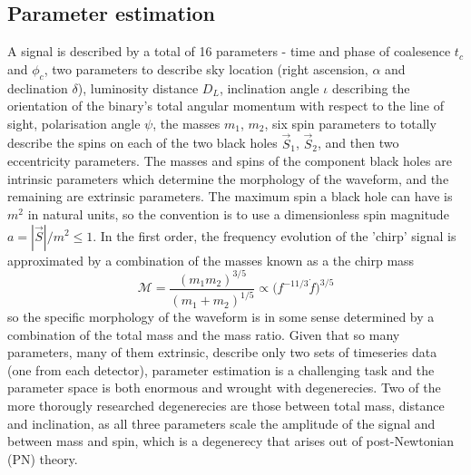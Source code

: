 \documentclass[]{article}
\begin{document}
\subsection{Parameter estimation}
A signal is described by a total of 16 parameters\cite{props} - time and phase of coalesence $t_c$ and $\phi_c$, two parameters to describe sky location (right ascension, $\alpha$ and declination $\delta$), luminosity distance $D_L$, inclination angle $\iota$ describing the orientation of the binary's total angular momentum with respect to the line of sight, polarisation angle $\psi$, the masses $m_1$, $m_2$, six spin parameters to totally describe the spins on each of the two black holes $\vec{S}_1$, $\vec{S}_2$, and then two eccentricity parameters. The masses and spins of the component black holes are intrinsic parameters which determine the morphology of the waveform, and the remaining are extrinsic parameters. The maximum spin a black hole can have is $m^2$ in natural units, so the convention is to use a dimensionless spin magnitude $a=|\vec{S}|/m^2 \leq 1$. In the first order, the frequency evolution of the 'chirp' signal is approximated by a combination of the masses known as a the chirp mass
\begin{equation}
\mathcal{M}=\frac{(m_1m_2)^{3/5}}{(m_1+m_2)^{1/5}}\propto \bigg(f^{-11/3}\dot{f}\bigg)^{3/5}
\end{equation}
so the specific morphology of the waveform is in some sense determined by a combination of the total mass and the mass ratio.
Given that so many parameters, many of them extrinsic, describe only two sets of timeseries data (one from each detector), parameter estimation is a challenging task and the parameter space is both enormous and wrought with degenerecies. Two of the more thorougly researched degenerecies are those between total mass, distance and inclination, as all three parameters scale the amplitude of the signal and between mass and spin\cite{spindegen}, which is a degenerecy that arises out of post-Newtonian (PN) theory. 
\end{document}
